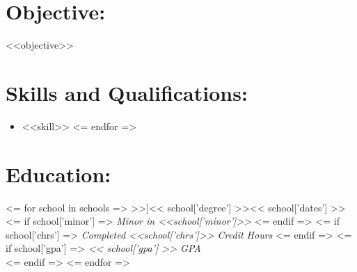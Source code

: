 \documentclass{resume}
\author{ <<author>> }
\begin{document}
\maketitle

\section{Objective:}

\small <<objective>> \normalsize

\section{Skills and Qualifications:}
\small\begin{itemize}
<= for skill in skills =>
    \item <<skill>>
<= endfor =>
\end{itemize}\normalsize

\section{Education:}

<= for school in schools =>
    \affiliation[<< school['place'] >>]{<< school['degree'] >>}{<< school['dates'] >>}
    <= if school['minor'] =>
        \textit{Minor in <<school['minor']>>}
    <= endif =>
    <= if school['chrs'] =>
        \textit{Completed <<school['chrs']>> Credit Hours}
    <= endif =>
    <= if school['gpa'] =>
        \emph{ << school['gpa'] >> GPA}\\
    <= endif =>
<= endfor =>
\end{document}
